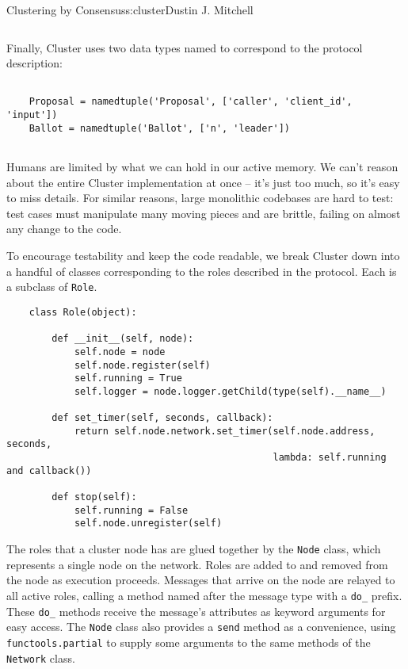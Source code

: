 \begin{aosachapter}{Clustering by Consensus}{s:cluster}{Dustin J. Mitchell}
\begin{verbatim}
\end{verbatim}

Finally, Cluster uses two data types named to correspond to the protocol
description:

\begin{verbatim}

    Proposal = namedtuple('Proposal', ['caller', 'client_id', 'input'])
    Ballot = namedtuple('Ballot', ['n', 'leader'])
    
\end{verbatim}

\label{component-model}

Humans are limited by what we can hold in our active memory. We can't
reason about the entire Cluster implementation at once -- it's just too
much, so it's easy to miss details. For similar reasons, large
monolithic codebases are hard to test: test cases must manipulate many
moving pieces and are brittle, failing on almost any change to the code.

To encourage testability and keep the code readable, we break Cluster
down into a handful of classes corresponding to the roles described in
the protocol. Each is a subclass of \texttt{Role}.

\begin{verbatim}
    class Role(object):
    
        def __init__(self, node):
            self.node = node
            self.node.register(self)
            self.running = True
            self.logger = node.logger.getChild(type(self).__name__)
    
        def set_timer(self, seconds, callback):
            return self.node.network.set_timer(self.node.address, seconds,
                                               lambda: self.running and callback())
    
        def stop(self):
            self.running = False
            self.node.unregister(self)
\end{verbatim}

The roles that a cluster node has are glued together by the
\texttt{Node} class, which represents a single node on the network.
Roles are added to and removed from the node as execution proceeds.
Messages that arrive on the node are relayed to all active roles,
calling a method named after the message type with a \texttt{do\_}
prefix. These \texttt{do\_} methods receive the message's attributes as
keyword arguments for easy access. The \texttt{Node} class also provides
a \texttt{send} method as a convenience, using
\texttt{functools.partial} to supply some arguments to the same methods
of the \texttt{Network} class.


\end{aosachapter}
